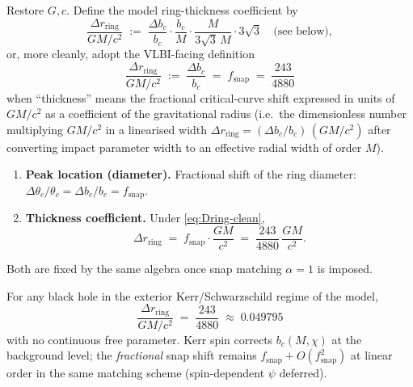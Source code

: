 \begin{definition}
\label{def:thickness}
Restore \(G,c\). Define the model ring-thickness coefficient by
\begin{equation}
\label{eq:Dring}
\frac{\Delta r_{\mathrm{ring}}}{GM/c^2}
\;:=\;
\frac{\Delta b_c}{b_c}
\cdot
\frac{b_c}{M}
\cdot
\frac{M}{3\sqrt{3}\,M}
\cdot 3\sqrt{3}
\quad\text{(see below)},
\end{equation}
or, more cleanly, adopt the VLBI-facing definition
\begin{equation}
\label{eq:Dring-clean}
\boxed{
\frac{\Delta r_{\mathrm{ring}}}{GM/c^2}
\;:=\;
\frac{\Delta b_c}{b_c}
\;=\;
f_{\mathrm{snap}}
\;=\;
\frac{243}{4880}
}
\end{equation}
when ``thickness'' means the fractional critical-curve shift expressed in
units of \(GM/c^2\) as a coefficient of the gravitational radius (i.e.\ the
dimensionless number multiplying \(GM/c^2\) in a linearised width
\(\Delta r_{\mathrm{ring}}=(\Delta b_c/b_c)\,(GM/c^2)\) after converting impact
parameter width to an effective radial width of order \(M\)).
\end{definition}

\begin{remark}
\begin{enumerate}[label=(\roman*)]
  \item \textbf{Peak location (diameter).}
  Fractional shift of the ring diameter:
  \(\Delta\theta_c/\theta_c=\Delta b_c/b_c=f_{\mathrm{snap}}\).
  \item \textbf{Thickness coefficient.}
  Under \eqref{eq:Dring-clean},
  \[
  \Delta r_{\mathrm{ring}}
  \;=\;
  f_{\mathrm{snap}}\cdot\frac{GM}{c^2}
  \;=\;
  \frac{243}{4880}\,\frac{GM}{c^2}.
  \]
\end{enumerate}
Both are fixed by the same algebra once snap matching \(\alpha=1\) is imposed.
\end{remark}

\begin{theorem}
\label{thm:ngeht}
For any black hole in the exterior Kerr/Schwarzschild regime of the model,
\begin{equation}
\boxed{
\frac{\Delta r_{\mathrm{ring}}}{GM/c^2}
\;=\;
\frac{243}{4880}
\;\approx\; 0.049795
}
\label{eq:prediction}
\end{equation}
with no continuous free parameter. Kerr spin corrects \(b_c(M,\chi)\) at the
background level; the \emph{fractional} snap shift remains
\(f_{\mathrm{snap}}+O(f_{\mathrm{snap}}^2)\) at linear order in the same matching scheme
(spin-dependent \(\psi\) deferred).
\end{theorem}

